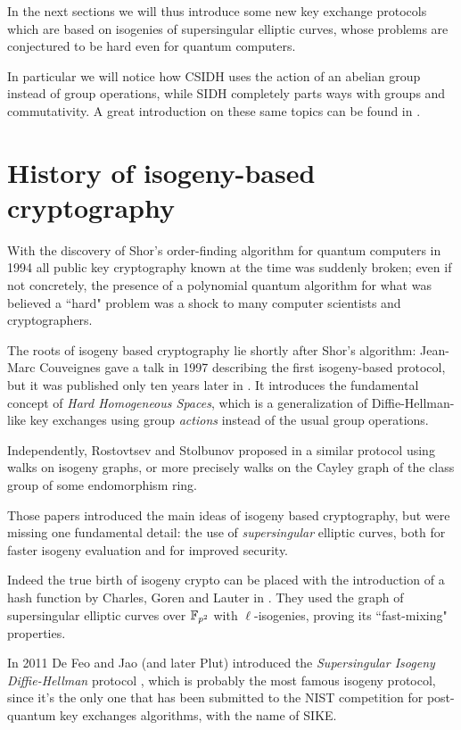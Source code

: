 In the next sections we will thus introduce some new key exchange protocols which are based on isogenies of supersingular elliptic curves, whose problems are conjectured to be hard even for quantum computers.

In particular we will notice how CSIDH uses the action of an abelian group instead of group operations, while SIDH completely parts ways with groups and commutativity. A great introduction on these same topics can be found in \cite{Smith_DH}.


\section{History of isogeny-based cryptography}
With the discovery of Shor's order-finding algorithm for quantum computers in 1994 all public key cryptography known at the time was suddenly broken; even if not concretely, the presence of a polynomial quantum algorithm for what was believed a ``hard" problem was a shock to many computer scientists and cryptographers.

The roots of isogeny based cryptography lie shortly after Shor's algorithm: Jean-Marc Couveignes gave a talk in 1997 describing the first isogeny-based protocol, but it was published only ten years later in \cite{Couveignes}. It introduces the fundamental concept of \emph{Hard Homogeneous Spaces}, which is a generalization of Diffie-Hellman-like key exchanges using group \emph{actions} instead of the usual group operations.

Independently, Rostovtsev and Stolbunov proposed in \cite{Rostovtsev} a similar protocol using walks on isogeny graphs, or more precisely walks on the Cayley graph of the class group of some endomorphism ring.

Those papers introduced the main ideas of isogeny based cryptography, but were missing one fundamental detail: the use of \emph{supersingular} elliptic curves, both for faster isogeny evaluation and for improved security.

Indeed the true birth of isogeny crypto can be placed with the introduction of a hash function by Charles, Goren and Lauter in \cite{CGL}. They used the graph of supersingular elliptic curves over $\mathbb{F}_{p^2}$ with $\ell$-isogenies, proving its ``fast-mixing" properties.

In 2011 De Feo and Jao (and later Plut) introduced the \emph{Supersingular Isogeny Diffie-Hellman} protocol \cite{SIDH}, which is probably the most famous isogeny protocol, since it's the only one that has been submitted to the NIST competition for post-quantum key exchanges algorithms, with the name of SIKE.

